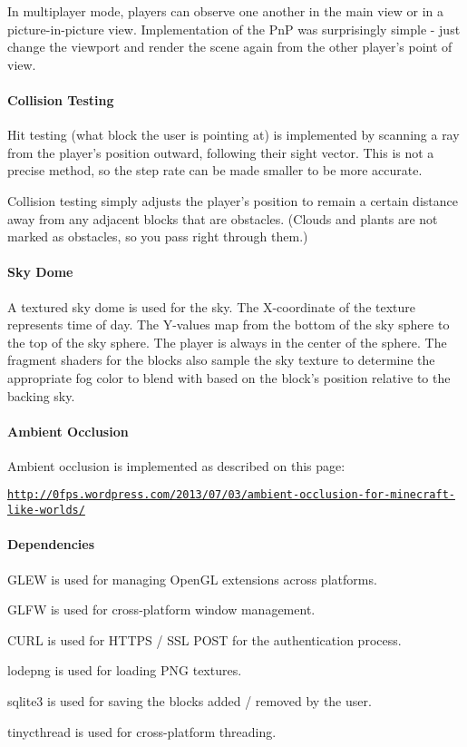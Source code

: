 In multiplayer mode, players can observe one another in the main view or in a picture-\/in-\/picture view. Implementation of the PnP was surprisingly simple -\/ just change the viewport and render the scene again from the other player’s point of view.

\paragraph*{Collision Testing}

Hit testing (what block the user is pointing at) is implemented by scanning a ray from the player’s position outward, following their sight vector. This is not a precise method, so the step rate can be made smaller to be more accurate.

Collision testing simply adjusts the player’s position to remain a certain distance away from any adjacent blocks that are obstacles. (Clouds and plants are not marked as obstacles, so you pass right through them.)

\paragraph*{Sky Dome}

A textured sky dome is used for the sky. The X-\/coordinate of the texture represents time of day. The Y-\/values map from the bottom of the sky sphere to the top of the sky sphere. The player is always in the center of the sphere. The fragment shaders for the blocks also sample the sky texture to determine the appropriate fog color to blend with based on the block’s position relative to the backing sky.

\paragraph*{Ambient Occlusion}

Ambient occlusion is implemented as described on this page\+:

\href{http://0fps.wordpress.com/2013/07/03/ambient-occlusion-for-minecraft-like-worlds/}{\tt http\+://0fps.\+wordpress.\+com/2013/07/03/ambient-\/occlusion-\/for-\/minecraft-\/like-\/worlds/}

\paragraph*{Dependencies}


\begin{DoxyItemize}
\item G\+L\+EW is used for managing Open\+GL extensions across platforms.
\item G\+L\+FW is used for cross-\/platform window management.
\item C\+U\+RL is used for H\+T\+T\+PS / S\+SL P\+O\+ST for the authentication process.
\item lodepng is used for loading P\+NG textures.
\item sqlite3 is used for saving the blocks added / removed by the user.
\item tinycthread is used for cross-\/platform threading. 
\end{DoxyItemize}